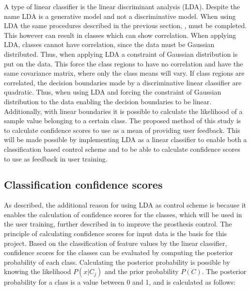 A type of linear classifier is the linear discriminant analysis (LDA). Despite the name LDA is a generative model and not a discriminative model. \cite{Duda2000} 
When using LDA the same procedures described in the previous section, , must be completed. This however can result in classes which can show correlation. When applying LDA, classes cannot have correlation, since the data must be Gaussian distributed. Thus, when applying LDA a constraint of Gaussian distribution is put on the data. This force the class regions to have no correlation and have the same covariance matrix, where only the class means will vary.
If class regions are correlated, the decision boundaries made by a discriminative linear classifier are quadratic. Thus, when using LDA and forcing the constraint of Gaussian distribution to the data enabling the decision boundaries to be linear. Additionally, with linear boundaries it is possible to calculate the likelihood of a sample value belonging to a certain class. \cite{Fisher1936, Duda2000}
The proposed method of this study is to calculate confidence scores to use as a mean of providing user feedback. This will be made possible by implementing LDA as a linear classifier to enable both a classification based control scheme and to be able to calculate confidence scores to use as feedback in user training. 


\subsection{Classification confidence scores} \label{sub:BG:classificationConfidenceScores}
As described, the additional reason for using LDA as control scheme is because it enables the calculation of confidence scores for the classes, which will be used in the user training, further described in  to improve the prosthesis control. The principle of calculating confidence scores for input data is the basis for this project. 
Based on the classification of feature values by the linear classifier, confidence scores for the classes can be evaluated by computing the posterior probability of each class. Calculating the posterior probability is possible by knowing the likelihood $P(x|C_j)$ and the prior probability $P(C)$.
The posterior probability for a class is a value between 0 and 1, and is calculated as follows:

